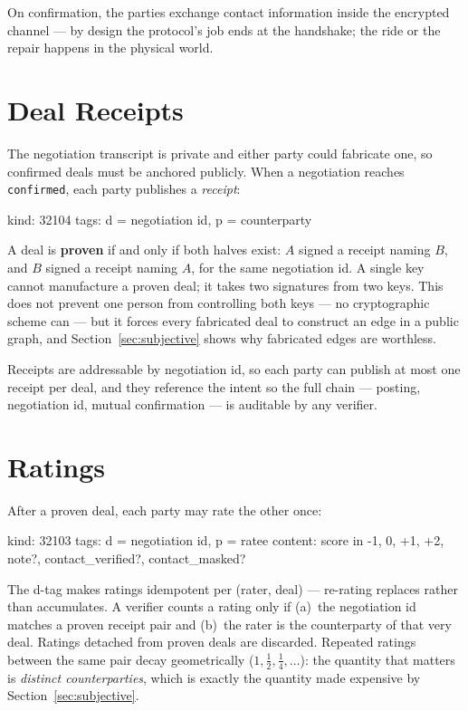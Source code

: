 \documentclass[11pt]{article}
\begin{document}
On confirmation, the parties exchange contact information inside the encrypted
channel --- by design the protocol's job ends at the handshake; the ride or
the repair happens in the physical world.

\section{Deal Receipts}

The negotiation transcript is private and either party could fabricate one,
so confirmed deals must be anchored publicly. When a negotiation reaches
\texttt{confirmed}, each party publishes a \emph{receipt}:

\begin{code}
kind:  32104
tags:  d = negotiation id, p = counterparty
\end{code}

A deal is \textbf{proven} if and only if both halves exist: $A$ signed a
receipt naming $B$, and $B$ signed a receipt naming $A$, for the same
negotiation id. A single key cannot manufacture a proven deal; it takes two
signatures from two keys. This does not prevent one person from controlling
both keys --- no cryptographic scheme can --- but it forces every fabricated
deal to construct an edge in a public graph, and
Section~\ref{sec:subjective} shows why fabricated edges are worthless.

Receipts are addressable by negotiation id, so each party can publish at
most one receipt per deal, and they reference the intent so the full chain
--- posting, negotiation id, mutual confirmation --- is auditable by any
verifier.

\section{Ratings}

After a proven deal, each party may rate the other once:

\begin{code}
kind:  32103
tags:  d = negotiation id, p = ratee
content: { score in {-1, 0, +1, +2}, note?,
           contact_verified?, contact_masked? }
\end{code}

The d-tag makes ratings idempotent per (rater, deal) --- re-rating replaces
rather than accumulates. A verifier counts a rating only if (a)~the
negotiation id matches a proven receipt pair and (b)~the rater is the
counterparty of that very deal. Ratings detached from proven deals are
discarded. Repeated ratings between the same pair decay geometrically
($1, \tfrac{1}{2}, \tfrac{1}{4}, \dots$): the quantity that matters is
\emph{distinct counterparties}, which is exactly the quantity made expensive
by Section~\ref{sec:subjective}.
\end{document}
